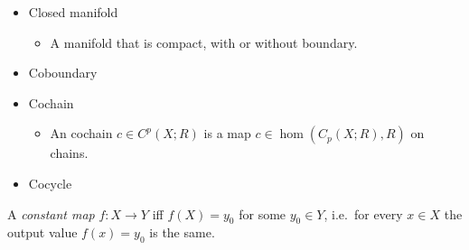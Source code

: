 \begin{itemize}
\item
  Closed manifold

  \begin{itemize}
  \tightlist
  \item
    A manifold that is compact, with or without boundary.
  \end{itemize}
\item
  Coboundary
\item
  Cochain

  \begin{itemize}
  \tightlist
  \item
    An cochain \(c \in C^p(X; R)\) is a map \(c \in \hom(C_p(X; R), R)\)
    on chains.
  \end{itemize}
\item
  Cocycle
\end{itemize}

\begin{definition}

A \emph{constant map} \(f: X\to Y\) iff \(f(X) = y_0\) for some
\(y_0\in Y\), i.e.~for every \(x\in X\) the output value \(f(x) = y_0\)
is the same.

\end{definition}

